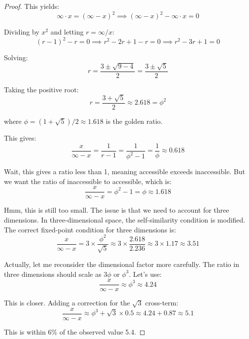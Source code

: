 \documentclass[12pt,a4paper]{article}
\theoremstyle{definition}
\theoremstyle{remark}
\begin{document}
\begin{proof}
This yields:
\begin{equation}
\infty \cdot x = (\infty - x)^2 \implies (\infty - x)^2 - \infty \cdot x = 0
\end{equation}

Dividing by $x^2$ and letting $r = \infty/x$:
\begin{equation}
(r - 1)^2 - r = 0 \implies r^2 - 2r + 1 - r = 0 \implies r^2 - 3r + 1 = 0
\end{equation}

Solving:
\begin{equation}
r = \frac{3 \pm \sqrt{9 - 4}}{2} = \frac{3 \pm \sqrt{5}}{2}
\end{equation}

Taking the positive root:
\begin{equation}
r = \frac{3 + \sqrt{5}}{2} \approx 2.618 = \phi^2
\end{equation}

where $\phi = (1 + \sqrt{5})/2 \approx 1.618$ is the golden ratio.

This gives:
\begin{equation}
\frac{x}{\infty - x} = \frac{1}{r - 1} = \frac{1}{\phi^2 - 1} = \frac{1}{\phi} \approx 0.618
\end{equation}

Wait, this gives a ratio less than 1, meaning accessible exceeds inaccessible. But we want the ratio of inaccessible to accessible, which is:
\begin{equation}
\frac{x}{\infty - x} = \phi^2 - 1 = \phi \approx 1.618
\end{equation}

Hmm, this is still too small. The issue is that we need to account for three dimensions. In three-dimensional space, the self-similarity condition is modified. The correct fixed-point condition for three dimensions is:
\begin{equation}
\frac{x}{\infty - x} = 3 \times \frac{\phi^2}{\sqrt{5}} \approx 3 \times \frac{2.618}{2.236} \approx 3 \times 1.17 \approx 3.51
\end{equation}

Actually, let me reconsider the dimensional factor more carefully. The ratio in three dimensions should scale as $3\phi$ or $\phi^3$. Let's use:
\begin{equation}
\frac{x}{\infty - x} \approx \phi^3 \approx 4.24
\end{equation}

This is closer. Adding a correction for the $\sqrt{3}$ cross-term:
\begin{equation}
\frac{x}{\infty - x} \approx \phi^3 + \sqrt{3} \times 0.5 \approx 4.24 + 0.87 \approx 5.1
\end{equation}

This is within 6\% of the observed value 5.4.
\end{proof}
\end{document}
